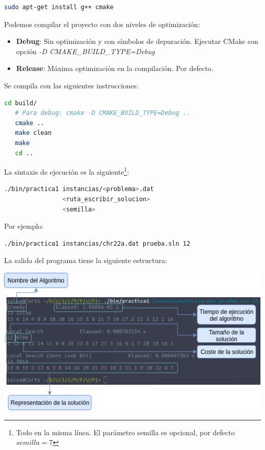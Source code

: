 \documentclass[a4paper, 12pt]{article}
\begin{document}
      \begin{lstlisting}[language=bash]
      sudo apt-get install g++ cmake 
      \end{lstlisting}
      
      Podemos compilar el proyecto con dos niveles de optimización:
      \begin{itemize}
         \item \textbf{Debug}: Sin optimización y con símbolos de depuración. Ejecutar CMake con opción \textit{-D CMAKE\_BUILD\_TYPE=Debug}
         
         \item \textbf{Release}: Máxima optimización en la compilación. Por defecto.
      \end{itemize}
      
      Se compila con las siguientes instrucciones:
      
      \begin{lstlisting}[language=bash]
   cd build/
   # Para debug: cmake -D CMAKE_BUILD_TYPE=Debug ..
   cmake ..  
   make clean
   make
   cd ..
      \end{lstlisting}
      
      \newpage
      La sintaxis de ejecución es la siguiente\footnote{Todo en la misma línea. El parámetro semilla es opcional, por defecto $semilla = 7$}:
      \begin{lstlisting}[language=bash]
./bin/practica1 instancias/<problema>.dat 
                <ruta_escribir_solucion> 
                <semilla>
      \end{lstlisting}
      
      Por ejemplo:
      \begin{lstlisting}[language=bash]
./bin/practica1 instancias/chr22a.dat prueba.sln 12
      \end{lstlisting}
      
      La salida del programa tiene la siguiente estructura:
      \begin{center}
      \includegraphics[scale=0.7]{execOutDiagram}
      \end{center}
      
\end{document}

